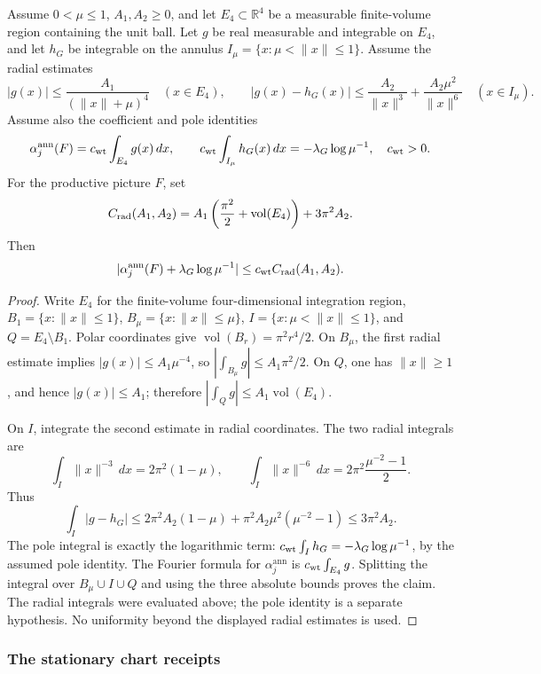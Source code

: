 \begin{lemma}
\label{lem:path-radial-log}
Assume $0<\mu\leq1$, $A_1,A_2\geq0$, and let $E_4\subset\mathbb R^4$
be a measurable finite-volume region containing the unit ball. Let $g$ be
real measurable and integrable on $E_4$, and let $h_G$ be integrable on the
annulus $I_\mu=\{x:\mu<\|x\|\leq1\}$. Assume the radial estimates
\[
 |g(x)|\leq\frac{A_1}{(\|x\|+\mu)^4}\quad(x\in E_4),\qquad
 |g(x)-h_G(x)|\leq\frac{A_2}{\|x\|^3}
                   +\frac{A_2\mu^2}{\|x\|^6}\quad(x\in I_\mu).
\]
Assume also the coefficient and pole identities
\[
 \alpha^{\mathrm{ann}}_j(F)=c_{\rm wt}\int_{E_4}g(x)\,dx,\qquad
 c_{\rm wt}\int_{I_\mu}h_G(x)\,dx=-\lambda_G\log\mu^{-1},
 \quad c_{\rm wt}>0.
\]
For the productive picture $F$, set
\[
 C_{\rm rad}(A_1,A_2)=A_1\left(\frac{\pi^2}{2}
       +\operatorname{vol}(E_4)\right)+3\pi^2 A_2.
\]
Then
\[
 |\alpha^{\mathrm{ann}}_j(F)+\lambda_G\log\mu^{-1}|
       \leq c_{\rm wt} C_{\rm rad}(A_1,A_2).
\]
\end{lemma}
\begin{proof}
Write $E_4$ for the finite-volume four-dimensional integration region,
$B_1=\{x:\|x\|\leq1\}$, $B_\mu=\{x:\|x\|\leq\mu\}$,
$I=\{x:\mu<\|x\|\leq1\}$, and $Q=E_4\setminus B_1$.
Polar coordinates give $\operatorname{vol}(B_r)=\pi^2r^4/2$.
On $B_\mu$, the first radial estimate implies
$|g(x)|\leq A_1\mu^{-4}$, so
$|\int_{B_\mu}g|\leq A_1\pi^2/2$. On $Q$, one has $\|x\|\geq1$,
and hence $|g(x)|\leq A_1$; therefore
$|\int_Qg|\leq A_1\operatorname{vol}(E_4)$.

On $I$, integrate the second estimate in radial coordinates. The two
radial integrals are
\[
 \int_I\|x\|^{-3}\,dx=2\pi^2(1-\mu),\qquad
 \int_I\|x\|^{-6}\,dx=2\pi^2\frac{\mu^{-2}-1}{2}.
\]
Thus
\[
 \int_I|g-h_G|\leq 2\pi^2A_2(1-\mu)
       +\pi^2 A_2\mu^2(\mu^{-2}-1)\leq3\pi^2A_2.
\]
The pole integral is exactly the logarithmic term:
$c_{\rm wt}\int_I h_G=-\lambda_G\log\mu^{-1}$, by the assumed pole identity. The Fourier formula for $\alpha^{\mathrm{ann}}_j$ is
$c_{\rm wt}\int_{E_4}g$. Splitting the integral over
$B_\mu\cup I\cup Q$ and using the three absolute bounds proves the
claim. The radial integrals were evaluated above; the pole identity is a separate hypothesis. No uniformity beyond the displayed radial estimates is used.
\end{proof}

\subsubsection{The stationary chart receipts}
\label{subsec:path-stationary-chart}

